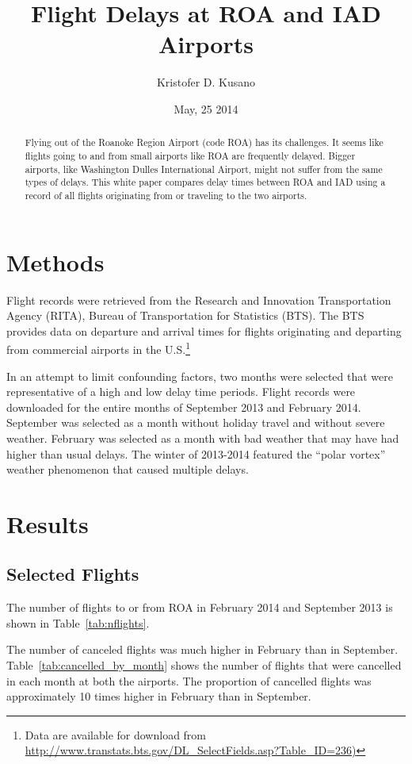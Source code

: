 \documentclass[dvips,letterpaper]{article}
\author{Kristofer D. Kusano}
\title{Flight Delays at ROA and IAD Airports}
\date{May, 25 2014}
\newcommand{\resultsdir}{../../results/2014-05-23/}
\begin{document}
\maketitle

\begin{abstract}
  Flying out of the Roanoke Region Airport (code ROA) has its challenges.
  It seems like flights going to and from small airports like ROA are frequently delayed.
  Bigger airports, like Washington Dulles International Airport, might not suffer from the same types of delays.
  This white paper compares delay times between ROA and IAD using a record of all flights originating from or traveling to the two airports.
\end{abstract}

\section{Methods}
\label{sec:Methods}
Flight records were retrieved from the Research and Innovation Transportation Agency (RITA), Bureau of Transportation for Statistics (BTS).
The BTS provides data on departure and arrival times for flights originating and departing from commercial airports in the U.S.\footnote{Data are available for download from
  \url{http://www.transtats.bts.gov/DL_SelectFields.asp?Table_ID=236)}}

In an attempt to limit confounding factors, two months were selected that were representative of a high and low delay time periods.
Flight records were downloaded for the entire months of September 2013 and February 2014.
September was selected as a month without holiday travel and without severe weather.
February was selected as a month with bad weather that may have had higher than usual delays.
The winter of 2013-2014 featured the ``polar vortex'' weather phenomenon that caused multiple delays.
\section{Results}
\label{sec:Results}

\subsection{Selected Flights}
\label{sub:select}
The number of flights to or from ROA in February 2014 and September 2013 is shown in Table~\ref{tab:nflights}.


The number of canceled flights was much higher in February than in September.
Table~\ref{tab:cancelled_by_month} shows the number of flights that were cancelled in each month at both the airports.
The proportion of cancelled flights was approximately 10 times higher in February than in September.

\end{document}
